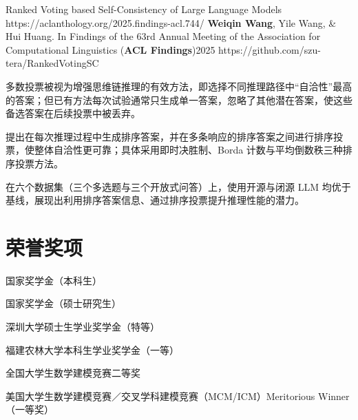 \pub
  {Ranked Voting based Self-Consistency of Large Language Models}
  {https://aclanthology.org/2025.findings-acl.744/}
  {\textbf{Weiqin Wang}, Yile Wang, \& Hui Huang.}
  {In Findings of the 63rd Annual Meeting of the Association for Computational Linguistics (\textbf{ACL Findings})}{2025}
  {https://github.com/szu-tera/RankedVotingSC}
\begin{pubnotes}
  \item {}多数投票被视为增强思维链推理的有效方法，即选择不同推理路径中“自洽性”最高的答案；但已有方法每次试验通常只生成单一答案，忽略了其他潜在答案，使这些备选答案在后续投票中被丢弃。
  \item {}提出在每次推理过程中生成排序答案，并在多条响应的排序答案之间进行排序投票，使整体自洽性更可靠；具体采用即时决胜制、Borda 计数与平均倒数秩三种排序投票方法。
  \item {}在六个数据集（三个多选题与三个开放式问答）上，使用开源与闭源 LLM 均优于基线，展现出利用排序答案信息、通过排序投票提升推理性能的潜力。
\end{pubnotes}

\section{荣誉奖项}
\begin{cvitems}
  \item 国家奖学金（本科生）
  \item 国家奖学金（硕士研究生）
  \item 深圳大学硕士生学业奖学金（特等）
  \item 福建农林大学本科生学业奖学金（一等）
  \item 全国大学生数学建模竞赛二等奖
  \item 美国大学生数学建模竞赛／交叉学科建模竞赛（MCM/ICM）Meritorious Winner（一等奖）
\end{cvitems}



